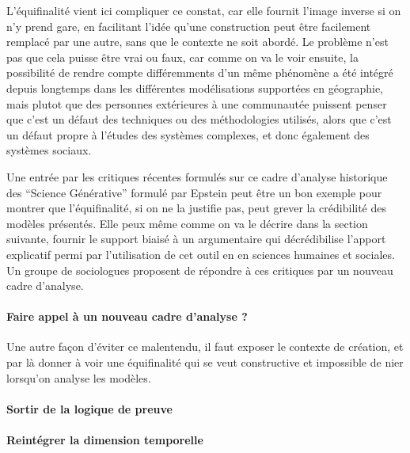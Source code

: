 L'équifinalité vient ici compliquer ce constat, car elle fournit l'image inverse si on n'y prend gare, en facilitant l'idée qu'une construction peut être facilement remplacé par une autre, sans que le contexte ne soit abordé. Le problème n'est pas que cela puisse être vrai ou faux, car comme on va le voir ensuite, la possibilité de rendre compte différemments d'un même phénomène a été intégré depuis longtemps dans les différentes modélisations supportées en géographie, mais plutot que des personnes extérieures à une communautée puissent penser que c'est un défaut des techniques ou des méthodologies utilisés, alors que c'est un défaut propre à l'études des systèmes complexes, et donc également des systèmes sociaux. 

Une entrée par les critiques récentes formulés sur ce cadre d'analyse historique des \enquote{Science Générative} formulé par Epstein peut être un bon exemple pour montrer que l'équifinalité, si on ne la justifie pas, peut grever la crédibilité des modèles présentés. Elle peux même comme on va le décrire dans la section suivante, fournir le support biaisé à un argumentaire qui décrédibilise l'apport explicatif permi par l'utilisation de cet outil en en sciences humaines et sociales. Un groupe de sociologues proposent de répondre à ces critiques par un nouveau cadre d'analyse. 

\paragraph{Faire appel à un nouveau cadre d'analyse ?}
\label{p:cadre_analyse}



Une autre façon d'éviter ce malentendu, il faut exposer le contexte de création, et par là donner à voir une équifinalité qui se veut constructive et impossible de nier lorsqu'on analyse les modèles.

\paragraph{Sortir de la logique de preuve}
\label{p:preuve}



\paragraph{Reintégrer la dimension temporelle}

